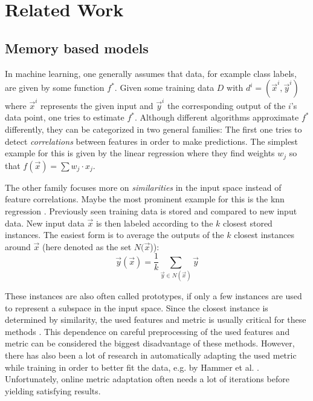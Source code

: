 \chapter{Related Work \label{chap:stateOfTheArt}}



\section{Memory based models}

In machine learning, one generally assumes that data, for example class labels, are given by some function $f^*$. Given some training data $D$ with $d^i =(\vec{x}^i,\vec{y}^i)$ where $\vec{x}^i$ represents the given input and $\vec{y}^i$ the corresponding output of the $i$'s data point, one tries to estimate $f^*$. 
Although different algorithms approximate $f^*$ differently, they can be categorized in two general families: The first one tries to detect \textit{correlations} between features in order to make predictions. The simplest example for this is given by the linear regression \cite{linearRegression} where they find weights $w_j$ so that $f(\vec{x}) = \sum w_j \cdot x_j$. 

The other family focuses more on \textit{similarities} in the input space instead of feature correlations. Maybe the most prominent example for this is the \gls{knn} regression \cite{knn}. Previously seen training data is stored and compared to new input data. New input data $\vec{x}$ is then labeled according to the $k$ closest stored instances. The easiest form is to average the outputs of the $k$ closest instances around $\vec{x}$ (here denoted as the set $N(\vec{x}$)):
\begin{equation}
\vec{y}(\vec{x}) = \frac{1}{k} \sum_{\vec{y} \in N(\vec{x})} \vec{y}
\end{equation}

These instances are also often called prototypes, if only a few instances are used to represent a subspace in the input space. Since the closest instance is determined by similarity, the used features and metric is usually critical for these methods \cite{importanceOfMetric/Features}. This dependence on careful preprocessing of the used features and metric can be considered the biggest disadvantage of these methods. However, there has also been a lot of research in automatically adapting the used metric while training in order to better fit the data, e.g. by Hammer et al. \cite{lvq}. Unfortunately, online metric adaptation often needs a lot of iterations before yielding satisfying results. 

